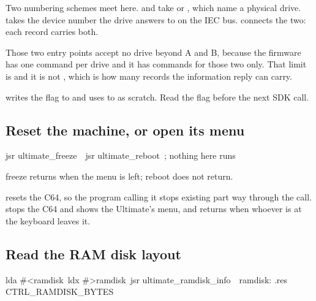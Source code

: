 \begin{note}
Two numbering schemes meet here.  and
 take  or
, which name a physical drive.
 takes the device number the drive answers to on the IEC
bus.  connects the two: each record carries both.

Those two entry points accept no drive beyond A and B, because the firmware has
one command per drive and it has commands for those two only. That limit is
 and it is not
, which is how many records the information reply can
carry.
\end{note}

\begin{warning}
 writes the flag to  and uses
 to  as scratch. Read the flag before
the next SDK call.
\end{warning}

\subsection*{Reset the machine, or open its menu}

\begin{listingbox}
\hspace*{2em}jsr ultimate\_freeze\
\
\hspace*{2em}jsr ultimate\_reboot\
\hspace*{2em}; nothing here runs
\end{listingbox}

\begin{resultbox}
freeze returns when the menu is left; reboot does not return.
\end{resultbox}

\cmd{ultimate\_reboot} resets the C64, so the program calling it stops existing
part way through the call.  stops the C64 and shows the
Ultimate's menu, and returns when whoever is at the keyboard leaves it.

\subsection*{Read the RAM disk layout}

\begin{listingbox}
\hspace*{2em}lda \#<ramdisk\
\hspace*{2em}ldx \#>ramdisk\
\hspace*{2em}jsr ultimate\_ramdisk\_info\
\
ramdisk: .res CTRL\_RAMDISK\_BYTES
\end{listingbox}

